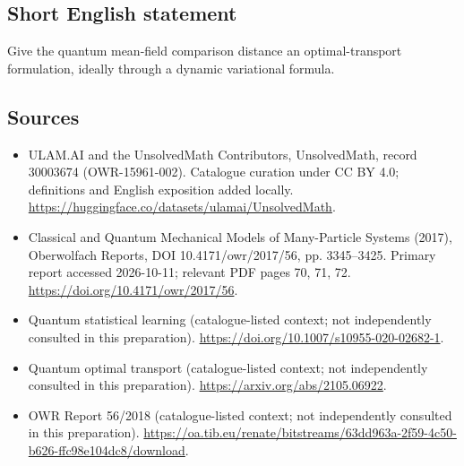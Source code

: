 \documentclass[11pt]{article}
\begin{document}
\subsection{Short English statement}
Give the quantum mean-field comparison distance an optimal-transport formulation, ideally through a dynamic variational formula.
\subsection{Sources}
\begin{itemize}
\item[\hypertarget{source:30003674:1}{S1}] ULAM.AI and the UnsolvedMath Contributors, UnsolvedMath, record 30003674 (OWR-15961-002). Catalogue curation under CC BY 4.0; definitions and English exposition added locally.
\url{https://huggingface.co/datasets/ulamai/UnsolvedMath}.
\item[\hypertarget{source:30003674:2}{S2}] Classical and Quantum Mechanical Models of Many-Particle Systems (2017), Oberwolfach Reports, DOI 10.4171/owr/2017/56, pp. 3345--3425. Primary report accessed 2026-10-11; relevant PDF pages 70, 71, 72.
\url{https://doi.org/10.4171/owr/2017/56}.
\item[\hypertarget{source:30003674:3}{S3}] Quantum statistical learning (catalogue-listed context; not independently consulted in this preparation).
\url{https://doi.org/10.1007/s10955-020-02682-1}.
\item[\hypertarget{source:30003674:4}{S4}] Quantum optimal transport (catalogue-listed context; not independently consulted in this preparation).
\url{https://arxiv.org/abs/2105.06922}.
\item[\hypertarget{source:30003674:5}{S5}] OWR Report 56/2018 (catalogue-listed context; not independently consulted in this preparation).
\url{https://oa.tib.eu/renate/bitstreams/63dd963a-2f59-4c50-b626-ffc98e104dc8/download}.
\end{itemize}
\label{end:30003674}
\end{document}
